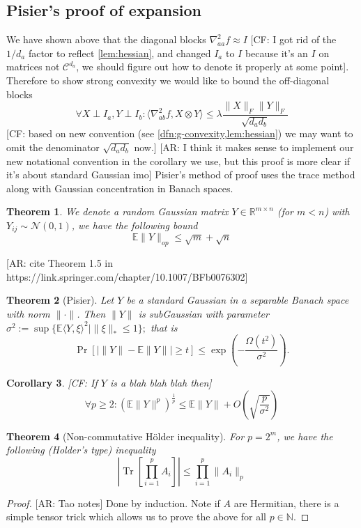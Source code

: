 \documentclass{article}
\newtheorem{theorem}{Theorem}
\newtheorem{corollary}[theorem]{Corollary}
\newcommand{\R}{{\mathbb{R}}}
\newcommand{\E}{\mathbb{E}}
\newcommand\tr{\operatorname{Tr}}
\newcommand\CC{\mathcal{C}}
\newcommand{\CF}[1]{{\color{purple}[CF: #1]}}
\newcommand{\AR}[1]{{\color{orange}[AR: #1]}}
\begin{document}
\subsection{Pisier's proof of expansion}
We have shown above that the diagonal blocks $\nabla^{2}_{aa} f \approx I$ \CF{ I got rid of the $1/{d_a}$ factor to reflect \cref{lem:hessian}, and changed $I_{a}$ to $I$ because it's an $I$ on matrices not $\CC^{d_a}$, we should figure out how to denote it properly at some point}. Therefore to show strong convexity we would like to bound the off-diagonal blocks
\[ \forall X \perp I_{a},Y \perp I_{b}:  \langle \nabla^{2}_{ab} f, X \otimes Y \rangle \leq \lambda \frac{\|X\|_{F} \|Y\|_{F}}{\sqrt{d_{a} d_{b}}}   \]
\CF{based on new convention (see \cref{dfn:g-convexity,lem:hessian}) we may want to omit the denominator $\sqrt{d_{a} d_{b}}$ now.} \AR{I think it makes sense to implement our new notational convention in the corollary we use, but this proof is more clear if it's about standard Gaussian imo} Pisier's method of proof uses the trace method along with Gaussian concentration in Banach spaces.

\begin{theorem}
We denote a random Gaussian matrix $Y \in \R^{m \times n}$ (for $m < n$) with $Y_{ij} \sim \mathcal{N}(0,1)$, we have the following bound
\[ \E \|Y\|_{op} \leq \sqrt{m} + \sqrt{n} \]
\end{theorem}

%
\AR{cite Theorem 1.5 in https://link.springer.com/chapter/10.1007/BFb0076302}
\begin{theorem} [Pisier]
Let $Y$ be a standard Gaussian in a separable Banach space with norm $\|\cdot\|$. Then $\|Y\|$ is subGaussian with parameter $\sigma^{2} := \sup \{ \E \langle Y, \xi \rangle^{2} \mid \|\xi\|_{*} \leq 1 \}; $ that is
\[ \Pr [ | \|Y\| - \E \|Y\| | \geq t ] \leq \exp \left( - \frac{\Omega(t^{2})}{\sigma^{2}} \right).   \]
\end{theorem}

\begin{corollary}\CF{If $Y$ is a blah blah blah then}
\[ \forall p \geq 2: (\E \|Y\|^{p})^{\frac{1}{p}} \leq \E \|Y\| + O \left( \sqrt{\frac{p}{\sigma^{2}}} \right)   \]
\end{corollary}

\begin{theorem}[Non-commutative H\"older inequality]\label{thm:holder}
For $p = 2^{m}$, we have the following (Holder's type) inequality
\[ |\tr[\prod_{i=1}^{p} A_{i}]| \leq \prod_{i=1}^{p} \|A_{i}\|_{p}   \]
\end{theorem}
\begin{proof}
\AR{Tao notes} Done by induction. Note if $A$ are Hermitian, there is a simple tensor trick which allows us to prove the above for all $p \in \mathbb{N}$.
\end{proof}
\end{document}
